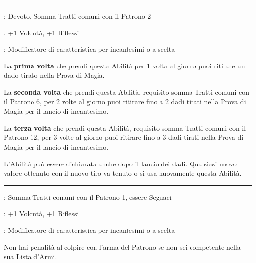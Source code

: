 \begin{multicols}{2}
\smallskip\noindent\rule{\linewidth}{2pt} \hypertarget{Il Patrono è con me}{}\medskip{}
\noindent
\begin{description}[noitemsep, topsep=0pt, parsep=0pt, partopsep=0pt, leftmargin=0cm, labelwidth=2.5cm]
    \item[\textbf{Requisito}]: Devoto, Somma Tratti comuni con il Patrono 2
    \item[\textbf{Tiri Salvezza}]: +1 Volontà, +1 Riflessi
    \item[\textbf{Caratteristica}]: Modificatore di caratteristica per incantesimi o a scelta
\end{description}

La \textbf{prima volta} che prendi questa Abilità per 1 volta al giorno puoi ritirare un dado tirato nella Prova di Magia.

La \textbf{seconda volta} che prendi questa Abilità, requisito somma Tratti comuni con il Patrono 6, per 2 volte al giorno puoi ritirare fino a 2 dadi tirati nella Prova di Magia per il lancio di incantesimo.

La \textbf{terza volta} che prendi questa Abilità, requisito somma Tratti comuni con il Patrono 12, per 3 volte al giorno puoi ritirare fino a 3 dadi tirati nella Prova di Magia per il lancio di incantesimo.

L'Abilità può essere dichiarata anche dopo il lancio dei dadi. Qualsiasi nuovo valore ottenuto con il nuovo tiro va tenuto o si usa nuovamente questa Abilità.

\smallskip\noindent\rule{\linewidth}{2pt} \hypertarget{Il Patrono è la mia Arma}{}\medskip{}\label{Il Patrono è la mia Arma}
\noindent
\begin{description}[noitemsep, topsep=0pt, parsep=0pt, partopsep=0pt, leftmargin=0cm, labelwidth=2.5cm]
    \item[\textbf{Requisito}]: Somma Tratti comuni con il Patrono 1, essere Seguaci
    \item[\textbf{Tiri Salvezza}]: +1 Volontà, +1 Riflessi
    \item[\textbf{Caratteristica}]: Modificatore di caratteristica per incantesimi o a scelta
\end{description}

Non hai penalità al colpire con l'arma del Patrono se non sei competente nella sua Lista d'Armi.


\end{multicols}
